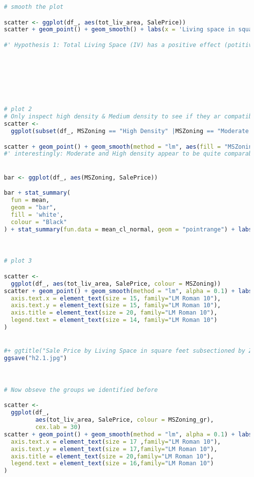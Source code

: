 \documentclass[a4paper]{article}
\begin{document}
\begin{lstlisting}[language=R]
# smooth the plot

scatter <- ggplot(df_, aes(tot_liv_area, SalePrice))
scatter + geom_point() + geom_smooth() + labs(x = 'Living space in square feet', y = "Sale Price in 1000s")+ xlim(0, 7000) 

#' Hypothesis 1: Total Living Space (IV) has a positive effect (potitive association with) on Sales Price (DV)







# plot 2
# Only inspect high density & Medium density to see if they ar compatible 
scatter <-
  ggplot(subset(df_, MSZoning == "High Density" |MSZoning == "Moderate Density"  ), aes(tot_liv_area, SalePrice, colour = MSZoning))

scatter + geom_point() + geom_smooth(method = "lm", aes(fill = "MSZoning"), alpha = 0.1) + labs(x = 'Living space in square feet', y = "Sale Price in 1000s", color = 'MSZoning')  #+ggtitle("Sale Price by Zone")
#' interestingly: Moderate and High density appear to be quite comparable


bar <- ggplot(df_, aes(MSZoning, SalePrice))

bar + stat_summary(
  fun = mean,
  geom = "bar",
  fill = 'white',
  colour = "Black"
) + stat_summary(fun.data = mean_cl_normal, geom = "pointrange") + labs(x = 'Zoning', y = 'Sale Price')



# plot 3

scatter <-
  ggplot(df_, aes(tot_liv_area, SalePrice, colour = MSZoning))
scatter + geom_point() + geom_smooth(method = "lm", alpha = 0.1) + labs(x = 'Living space in square feet', y = "Sale Price in 1000s") + xlim(0, 7000) + theme_set(theme_bw()+ theme(legend.position = "bottom"))  + theme(
  axis.text.x = element_text(size = 15, family="LM Roman 10"),
  axis.text.y = element_text(size = 15, family="LM Roman 10"),
  axis.title = element_text(size = 20, family="LM Roman 10"),
  legend.text = element_text(size = 14, family="LM Roman 10")
)     


#+ ggtitle("Sale Price by Living Space in square feet subsectioned by Zone")
ggsave("h2.1.jpg")



# Now obseve the groups we identified before

scatter <-
  ggplot(df_,
         aes(tot_liv_area, SalePrice, colour = MSZoning_gr),
         cex.lab = 30)
scatter + geom_point() + geom_smooth(method = "lm", alpha = 0.1) + labs(x = 'Living space in square feet', y = "Sale Price in 1000s", color = 'MSZoning_gr') + xlim(0, 7000)  + theme_set(theme_bw() + theme(legend.position = "bottom")) + theme(
  axis.text.x = element_text(size = 17 ,family="LM Roman 10"),
  axis.text.y = element_text(size = 17,family="LM Roman 10"),
  axis.title = element_text(size = 20,family="LM Roman 10"),
  legend.text = element_text(size = 16,family="LM Roman 10")
)     


\end{lstlisting}
\end{document}
